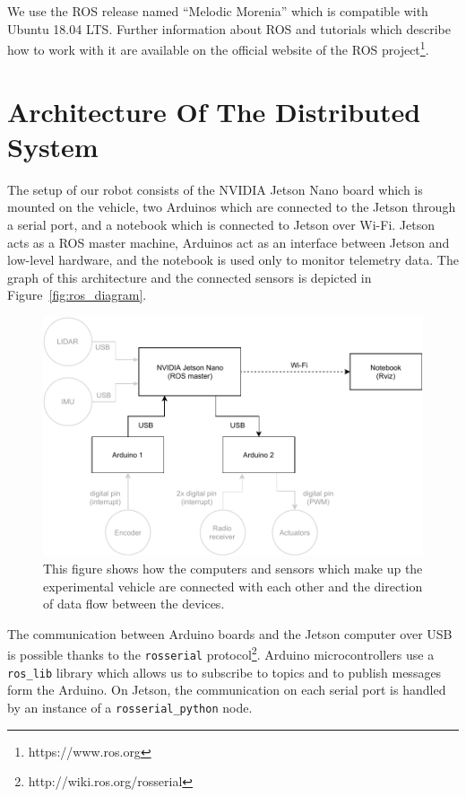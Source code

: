We use the \gls*{ROS} release named ``Melodic Morenia'' which is compatible with Ubuntu 18.04 LTS. Further information about \gls*{ROS} and tutorials which describe how to work with it are available on the official website of the \gls*{ROS} project\footnote{https://www.ros.org}.

\section{Architecture Of The Distributed System}

The setup of our robot consists of the NVIDIA Jetson Nano board which is mounted on the vehicle, two Arduinos which are connected to the Jetson through a serial port, and a notebook which is connected to Jetson over Wi-Fi. Jetson acts as a \gls*{ROS} master machine, Arduinos act as an interface between Jetson and low-level hardware, and the notebook is used only to monitor telemetry data. The graph of this architecture and the connected sensors is depicted in Figure~\ref{fig:ros_diagram}.

\begin{figure}
	\centering
	\includegraphics[width=125mm]{../img/ros_diagram}
	\caption{This figure shows how the computers and sensors which make up the experimental vehicle are connected with each other and the direction of data flow between the devices.}
	\label{fig:rosdiagram}
\end{figure}

The communication between Arduino boards and the Jetson computer over USB is possible thanks to the \verb|rosserial| protocol\footnote{http://wiki.ros.org/rosserial}. Arduino microcontrollers use a \verb|ros_lib| library which allows us to subscribe to topics and to publish messages form the Arduino. On Jetson, the communication on each serial port is handled by an instance of a \verb|rosserial_python| node.

